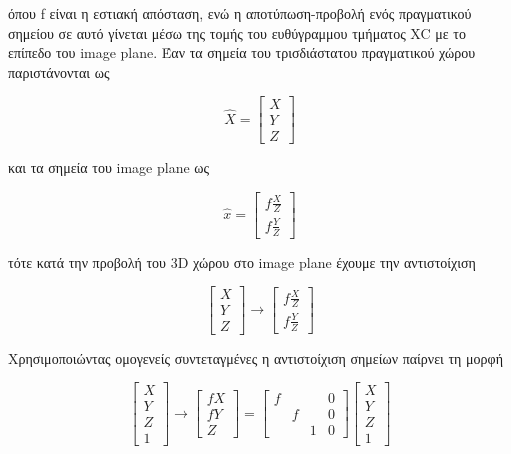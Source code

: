 όπου f είναι η εστιακή απόσταση, ενώ η αποτύπωση-προβολή ενός πραγματικού σημείου σε αυτό γίνεται μέσω της τομής του ευθύγραμμου τμήματος XC με το επίπεδο του image plane.
Έαν τα σημεία του τρισδιάστατου πραγματικού χώρου παριστάνονται ως 

\begin{equation}
\hat{X}=
\begin{bmatrix}
X\\ 
Y\\ 
Z
\end{bmatrix}
\end{equation}

και τα σημεία του image plane ως


\begin{equation}
\hat{x}=
\begin{bmatrix}
f\frac{X}{Z}\\ 
f\frac{Y}{Z}
\end{bmatrix}
\end{equation}

τότε κατά την προβολή του 3D χώρου στο image plane έχουμε την αντιστοίχιση 


\begin{equation}
\begin{bmatrix}
X\\ 
Y\\ 
Z
\end{bmatrix}
\rightarrow
\begin{bmatrix}
f\frac{X}{Z}\\ 
f\frac{Y}{Z}
\end{bmatrix}
\end{equation}

Χρησιμοποιώντας ομογενείς συντεταγμένες η αντιστοίχιση σημείων παίρνει τη μορφή 

\begin{equation}
\begin{bmatrix}
X\\ 
Y\\ 
Z\\
1
\end{bmatrix}
\rightarrow
\begin{bmatrix}
fX\\ 
fY\\
Ζ
\end{bmatrix}
=
\begin{bmatrix}
f &  &  & 0\\ 
 & f & & 0\\
 & & 1 & 0
\end{bmatrix}
\begin{bmatrix}
X\\ 
Y\\
Z\\
1
\end{bmatrix}
\end{equation}

